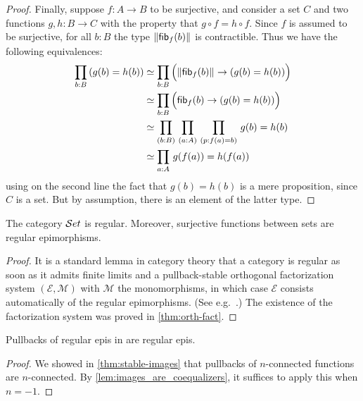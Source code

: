 \begin{proof}
Finally, suppose $f:A\to B$ to be surjective, and consider a set $C$ and two functions
$g,h:B\to C$ with the property that $g\circ f = h\circ f$. Since $f$
is assumed to be surjective, for all $b:B$ the type $\mathopen{}\left\Vert {\mathsf{fib}}_{f}(b)\right\Vert_{}\mathclose{}$ is contractible.
Thus we have the following equivalences:
\begin{align*}
\prd{b:B} (g(b)= h(b))
& \eqvsym \prd{b:B} \Parens{\brck{\hfib f b} \to (g(b)= h(b))}\\
& \eqvsym \prd{b:B} \Parens{\hfib f b \to (g(b)= h(b))}\\
& \eqvsym \prd{b:B}{a:A}{p:f(a)= b} g(b)= h(b)\\
& \eqvsym \prd{a:A} g(f(a))= h(f(a))
\end{align*}
using on the second line the fact that $g(b)=h(b)$ is a mere proposition, since $C$ is a set.
But by assumption, there is an element of the latter type.
\end{proof}


\begin{thm}\label{thm:set_regular}\label{lem:images_are_coequalizers}
The category $\mathcal{S}et$ is regular. Moreover, surjective functions between sets are regular epimorphisms.
\end{thm}

\begin{proof}
It is a standard lemma in category theory that a category is regular as soon as it admits finite limits and a pullback-stable orthogonal
factorization system $(\mathcal{E},\mathcal{M})$ with $\mathcal{M}$ the monomorphisms, in which case $\mathcal{E}$ consists automatically of
the regular epimorphisms.
(See e.g.~\cite[A1.3.4]{elephant}.)
The existence of the factorization system was proved in \cref{thm:orth-fact}.
\end{proof}

\begin{lem}\label{lem:pb_of_coeq_is_coeq}
Pullbacks of regular epis in \uset are regular epis.
\end{lem}
\begin{proof}
  We showed in \cref{thm:stable-images} that pullbacks of $n$-connected functions are $n$-connected.
  By \cref{lem:images_are_coequalizers}, it suffices to apply this when $n=-1$.
\end{proof}

